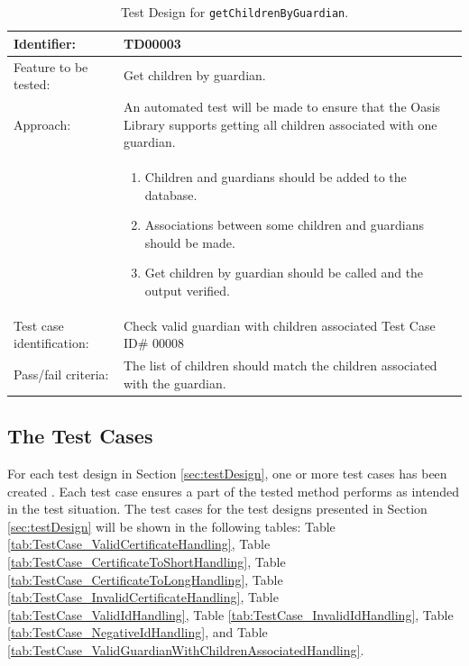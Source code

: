 \begin{table}[htbp]
	\centering
		\begin{tabular}{| p{4.5cm} | m{9cm} |}
			\hline
			Identifier: 				& TD00003 \\ \hline
			Feature to be tested:		& Get children by guardian. \\ \hline
			Approach:					& An automated test will be made to ensure that the Oasis Library supports getting all children associated with one guardian. \\
										&	\begin{enumerate}
												\item Children and guardians should be added to the database.
												\item Associations between some children and guardians should be made.
												\item Get children by guardian should be called and the output verified.
											\end{enumerate} \\ \hline
			Test case identification: 	& Check valid guardian with children associated Test Case ID\# 00008 \\ \hline
			Pass/fail criteria:			& The list of children should match the children associated with the guardian. \\ \hline
		\end{tabular}
	\caption{Test Design for \texttt{getChildrenByGuardian}.}
	\label{tab:TestDesign_GetChildrenByGuardian}
\end{table}



\subsection{The Test Cases}
For each test design in Section \vref{sec:testDesign}, one or more test cases has been created \cite[pp283]{Testing}.
Each test case ensures a part of the tested method performs as intended in the test situation.
The test cases for the test designs presented in Section \vref{sec:testDesign} will be shown in the following tables:
Table \vref{tab:TestCase_ValidCertificateHandling}, 
Table \vref{tab:TestCase_CertificateToShortHandling},
Table \vref{tab:TestCase_CertificateToLongHandling},
Table \vref{tab:TestCase_InvalidCertificateHandling},
Table \vref{tab:TestCase_ValidIdHandling},
Table \vref{tab:TestCase_InvalidIdHandling},
Table \vref{tab:TestCase_NegativeIdHandling}, 
and Table \vref{tab:TestCase_ValidGuardianWithChildrenAssociatedHandling}.

